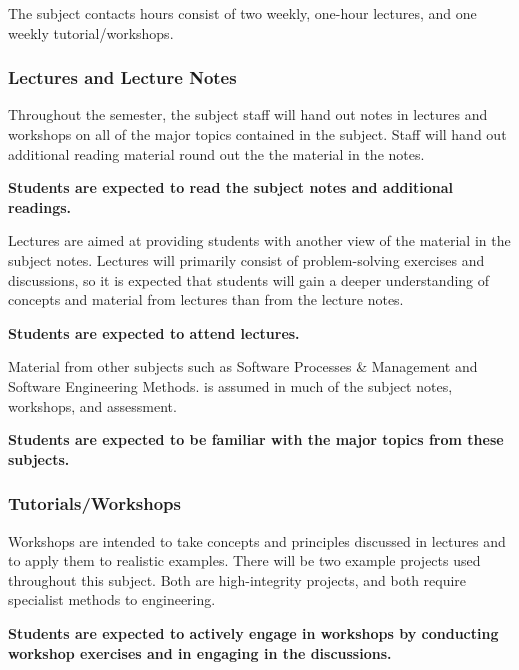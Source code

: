 \documentclass{article}
\begin{document}
The subject contacts hours consist of two weekly, one-hour lectures,
and one weekly tutorial/workshops. 

\subsubsection*{Lectures and Lecture Notes}

Throughout the semester, the subject staff will hand out notes in lectures and workshops on all of the major topics
contained in the subject. Staff will hand out additional
reading material round out the the material in the notes.

\begin{center}
{\bf Students are expected to read the subject notes and additional
  readings.}
\end{center}

Lectures are aimed at providing students with another view of the material
in the subject notes. Lectures will primarily consist of
problem-solving exercises and discussions, so it is expected that students
will gain a deeper understanding of concepts and material from
lectures than from the lecture notes.

\begin{center}
{\bf Students are expected to attend lectures.}
\end{center}

Material from other subjects such as Software Processes \& Management and Software Engineering Methods. is assumed in
much of the subject notes, workshops, and assessment.

\begin{center}
  {\bf Students are expected to be familiar with the major topics from
    these subjects.}
\end{center}


\subsubsection*{Tutorials/Workshops}

Workshops are intended to take concepts and principles discussed in
lectures and to apply them to realistic examples. There will be two
example projects used throughout this subject. Both are high-integrity projects, and both require specialist methods to engineering.

\begin{center}
{\bf Students are expected to actively engage in workshops
  by conducting workshop exercises and in engaging in the
  discussions.}  
\end{center}
\end{document}
